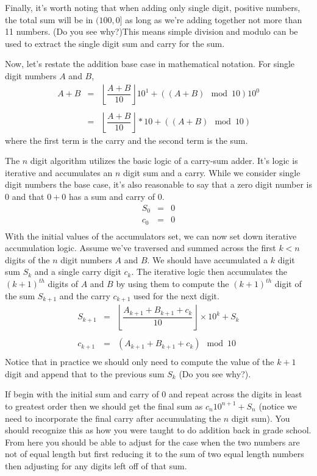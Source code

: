 \documentclass[10pt]{article}
\begin{document}
Finally, it's worth noting that when adding only single digit, positive numbers, the total sum will be in $(100,0]$ as long as we're adding together not more than 11 numbers. (Do you see why?)This means simple division and modulo can be used to extract the single digit sum and carry for the sum. 

Now, let's restate the addition base case in mathematical notation. For single digit numbers $A$ and $B$,
\[
\begin{array}{rcl}
A+B &=& \left\lfloor\dfrac{A+B}{10}\right\rfloor10^1 + ((A+B)\mod 10)10^0 \\ \\
&=& \left\lfloor\dfrac{A+B}{10}\right\rfloor*10 + ((A+B)\mod 10)
\end{array}
\]
where the first term is the carry and the second term is the sum.

The $n$ digit algorithm utilizes the basic logic of a carry-sum adder. It's logic is iterative and accumulates an $n$ digit sum and a carry. While we consider single digit numbers the base case, it's also reasonable to say that a zero digit number is $0$ and that $0+0$ has a sum and carry of $0$. 
\[
\begin{array}{rcl}
S_{0} &=& 0 \\
c_{0} &=& 0 \\
\end{array}
\]
With the initial values of the accumulators set, we can now set down iterative accumulation logic. Assume we've traversed and summed across the first $k < n$ digits of the $n$ digit numbers $A$ and $B$. We should have accumulated a $k$ digit sum $S_k$ and a single carry digit $c_k$. The iterative logic then accumulates the $(k+1)^{th}$ digits of $A$ and $B$ by using them to compute the $(k+1)^{th}$ digit of the sum $S_{k+1}$ and the carry $c_{k+1}$ used for the next digit.
\[
\begin{array}{rcl}
S_{k+1} &=& \left\lfloor \dfrac{A_{k+1} + B_{k+1} + c_k}{10} \right\rfloor\times10^k + S_k \\ \\
c_{k+1} &=& (A_{k+1} + B_{k+1} + c_k) \mod 10 \\
\end{array}
\]
Notice that in practice we should only need to compute the value of the $k+1$ digit and append that to the previous sum $S_k$ (Do you see why?). 

If begin with the initial sum and carry of $0$ and repeat across the digits in least to greatest order then we should get the final sum as $c_n10^{n+1}+S_n$ (notice we need to incorporate the final carry after accumulating the $n$ digit sum). You should recognize this as how you were taught to do addition back in grade school. From here you should be able to adjust for the case when the two numbers are not of equal length but first reducing it to the sum of two equal length numbers then adjusting for any digits left off of that sum. 
\end{document}
